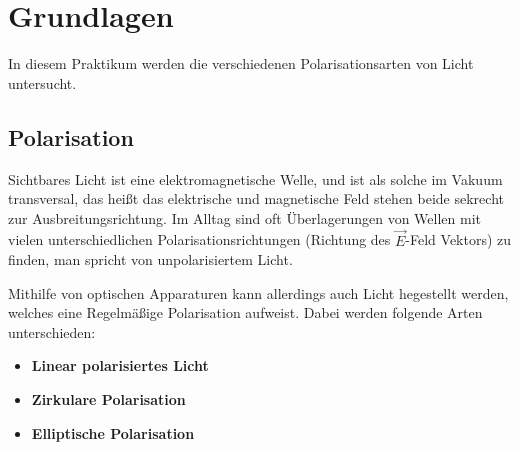 \chapter{Grundlagen}

In diesem Praktikum werden die verschiedenen Polarisationsarten von Licht untersucht.

\section{Polarisation}

Sichtbares Licht ist eine elektromagnetische Welle, und ist als solche im Vakuum transversal, das heißt das elektrische und magnetische Feld stehen beide sekrecht zur Ausbreitungsrichtung.
Im Alltag sind oft Überlagerungen von Wellen mit vielen unterschiedlichen Polarisationsrichtungen (Richtung des $\vec{E}$-Feld Vektors) zu finden, man spricht von unpolarisiertem Licht.

Mithilfe von optischen Apparaturen kann allerdings auch Licht hegestellt werden, welches eine Regelmäßige Polarisation aufweist.
Dabei werden folgende Arten unterschieden:

\begin{itemize}
	\item \textbf{Linear polarisiertes Licht}
	\item \textbf{Zirkulare Polarisation}
	\item \textbf{Elliptische Polarisation}
\end{itemize}
